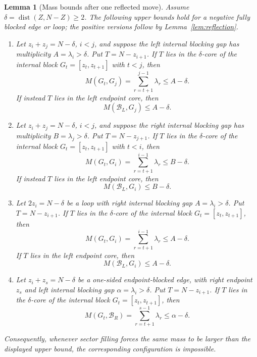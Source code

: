 \documentclass[11pt]{article}
\newtheorem{lemma}[theorem]{Lemma}
\newcommand{\dist}{\operatorname{dist}}
\begin{document}
\begin{lemma}[Mass bounds after one reflected move]\label{lem:reflected-defect}
Assume $\delta=\dist(Z,N-Z)\ge2$.  The following upper bounds hold for a negative fully blocked edge or loop; the positive versions follow by Lemma~\ref{lem:reflection}.
\begin{enumerate}[label=(\roman*),leftmargin=*]
\item Let $z_i+z_j=N-\delta$, $i<j$, and suppose the left internal blocking gap has multiplicity $A=\lambda_i>\delta$.  Put $T=N-z_{i+1}$.  If $T$ lies in the $\delta$-core of the internal block $G_t=[z_t,z_{t+1}]$ with $t<j$, then
\[
        M(G_t,G_j)=\sum_{r=t+1}^{j-1}\lambda_r\le A-\delta.
\]
If instead $T$ lies in the left endpoint core, then
\[
        M(\mathcal B_L,G_j)\le A-\delta.
\]
\item Let $z_i+z_j=N-\delta$, $i<j$, and suppose the right internal blocking gap has multiplicity $B=\lambda_j>\delta$.  Put $T=N-z_{j+1}$.  If $T$ lies in the $\delta$-core of the internal block $G_t=[z_t,z_{t+1}]$ with $t<i$, then
\[
        M(G_t,G_i)=\sum_{r=t+1}^{i-1}\lambda_r\le B-\delta.
\]
If instead $T$ lies in the left endpoint core, then
\[
        M(\mathcal B_L,G_i)\le B-\delta.
\]
\item Let $2z_i=N-\delta$ be a loop with right internal blocking gap $A=\lambda_i>\delta$.  Put $T=N-z_{i+1}$.  If $T$ lies in the $\delta$-core of the internal block $G_t=[z_t,z_{t+1}]$, then
\[
        M(G_t,G_i)=\sum_{r=t+1}^{i-1}\lambda_r\le A-\delta.
\]
If $T$ lies in the left endpoint core, then
\[
        M(\mathcal B_L,G_i)\le A-\delta.
\]
\item Let $z_i+z_s=N-\delta$ be a one-sided endpoint-blocked edge, with right endpoint $z_s$ and left internal blocking gap $\alpha=\lambda_i>\delta$.  Put $T=N-z_{i+1}$.  If $T$ lies in the $\delta$-core of the internal block $G_t=[z_t,z_{t+1}]$, then
\[
        M(G_t,\mathcal B_R)=\sum_{r=t+1}^{s-1}\lambda_r\le \alpha-\delta.
\]
\end{enumerate}
Consequently, whenever sector filling forces the same mass to be larger than the displayed upper bound, the corresponding configuration is impossible.
\end{lemma}
\end{document}
